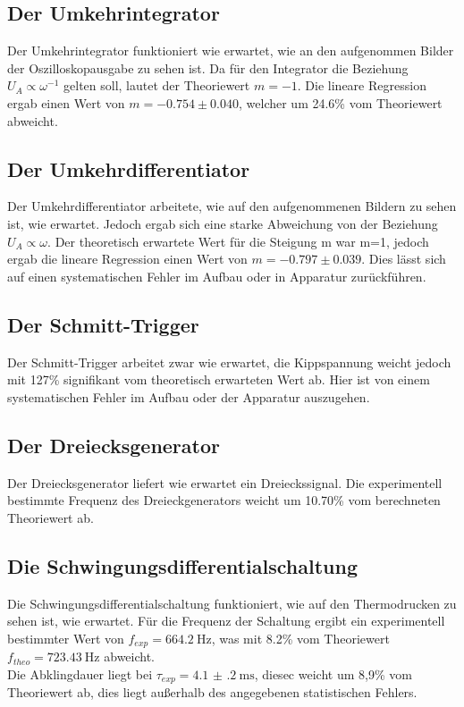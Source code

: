 \documentclass[]{scrartcl}
\begin{document}
\subsection{Der Umkehrintegrator}
Der Umkehrintegrator funktioniert wie erwartet, wie an den aufgenommen Bilder der Oszilloskopausgabe zu sehen ist. Da für den Integrator die Beziehung $U_A\propto\omega^{-1}$ gelten soll, lautet der Theoriewert $m=-1$. Die lineare Regression ergab einen Wert von $m=-0.754\pm0.040$, welcher um 24.6\% vom Theoriewert abweicht.

\subsection{Der Umkehrdifferentiator}
Der Umkehrdifferentiator arbeitete, wie auf den aufgenommenen Bildern zu sehen ist, wie erwartet. Jedoch ergab sich eine starke Abweichung von der Beziehung $U_A\propto\omega$. Der theoretisch erwartete Wert für die Steigung m war m=1, jedoch ergab die lineare Regression einen Wert von $m = -0.797 \pm 0.039$. Dies lässt sich auf einen systematischen Fehler im Aufbau oder in Apparatur zurückführen.

\subsection{Der Schmitt-Trigger}
Der Schmitt-Trigger arbeitet zwar wie erwartet, die Kippspannung weicht jedoch mit 127\% signifikant vom theoretisch erwarteten Wert ab. Hier ist von einem systematischen Fehler im Aufbau oder der Apparatur auszugehen.

\subsection{Der Dreiecksgenerator}
Der Dreiecksgenerator liefert wie erwartet ein Dreieckssignal. Die experimentell bestimmte Frequenz des Dreieckgenerators weicht um 10.70\% vom berechneten Theoriewert ab.

\subsection{Die Schwingungsdifferentialschaltung}
Die Schwingungsdifferentialschaltung funktioniert, wie auf den Thermodrucken zu sehen ist, wie erwartet. Für die Frequenz der Schaltung ergibt ein experimentell bestimmter Wert von $f_{exp}=\SI{664.2}{\hertz}$, was mit 8.2\% vom Theoriewert $f_{theo}=\SI{723.43}{\hertz}$ abweicht. \\
Die Abklingdauer liegt bei $\tau_{exp}=\SI{4.1(2)}{\milli\second}$, diesec weicht um 8,9\% vom Theoriewert ab, dies liegt außerhalb des angegebenen statistischen Fehlers.
\end{document}
